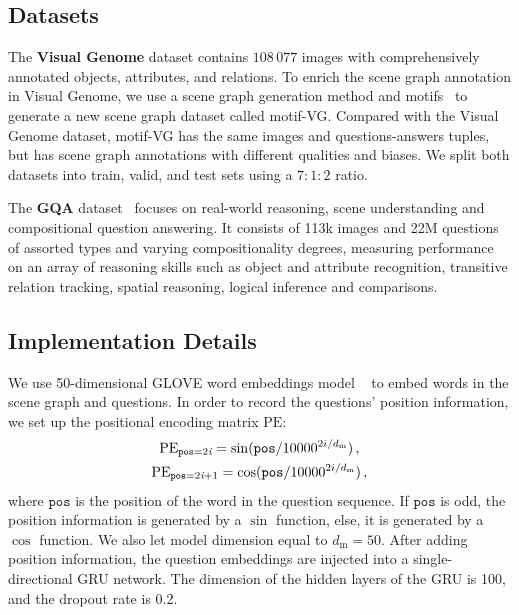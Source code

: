 \documentclass[letterpaper]{article} %
\begin{document}
\subsection{Datasets}

The \textbf{Visual Genome} dataset contains $108 \, 077$ images with comprehensively annotated objects, attributes, and relations. To enrich the scene graph annotation in Visual Genome, we use a scene graph generation method and motifs~\cite{DBLP:conf/cvpr/ZellersYTC18} to generate a new scene graph dataset called motif-VG. 
Compared with the Visual Genome dataset, motif-VG has the same images and questions-answers tuples, but has scene graph annotations with different qualities and biases. 
We split both datasets into train, valid, and test sets using a $7:1:2$ ratio. 

\quad The \textbf{GQA} dataset~\cite{DBLP:conf/cvpr/HudsonM19} focuses on real-world reasoning, scene understanding and compositional question answering. It consists of 113k images and 22M questions of assorted types and varying compositionality degrees, measuring performance on an array of reasoning skills such as object and attribute recognition, transitive relation tracking, spatial reasoning, logical inference and comparisons.



\subsection{Implementation Details}

We use 50-dimensional GLOVE word embeddings model ~\cite{pennington-etal-2014-glove} to embed words in the scene graph and questions. In order to record the questions' position information, we set up the positional encoding matrix $\textrm{PE}$:
\begin{gather}\notag
    \textrm{PE}_{\texttt{pos}=2\emph{i}} = \sin(\texttt{pos}/10000^{2i/d_{\textrm{m}}}) \, ,\\
    \textrm{PE}_{\texttt{pos}=2\emph{i}+1} = \cos(\texttt{pos}/10000^{2i/d_{\textrm{m}}}) \, , \notag
\end{gather}
where $\texttt{pos}$ is the position of the word in the question sequence. 
If $\texttt{pos}$ is odd, the position information is generated by a $\sin$ function, else, it is generated by a $\cos$ function. 
We also let model dimension equal to $d_{\textrm{m}}=50$.
After adding position information, the question embeddings are injected into a single-directional GRU network. 
The dimension of the hidden layers of the GRU is 100, and the dropout rate is 0.2.
\end{document}
